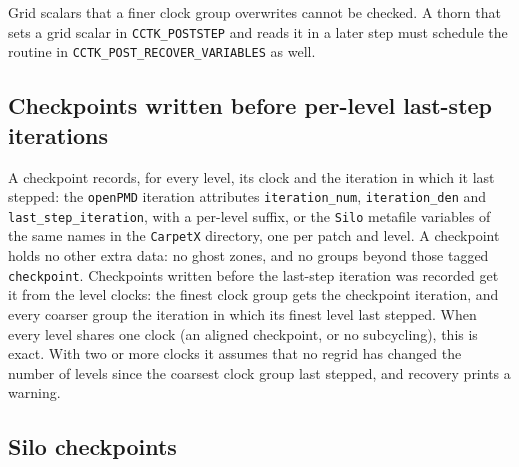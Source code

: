 Grid scalars that a finer clock group overwrites cannot be checked. A thorn that sets a grid scalar in \texttt{CCTK\_POSTSTEP} and reads it in a later step must schedule the routine in \texttt{CCTK\_POST\_RECOVER\_VARIABLES} as well.

\subsection{Checkpoints written before per-level last-step iterations}

A checkpoint records, for every level, its clock and the iteration in which it last stepped: the \texttt{openPMD} iteration attributes \texttt{iteration\_num}, \texttt{iteration\_den} and \texttt{last\_step\_iteration}, with a per-level suffix, or the \texttt{Silo} metafile variables of the same names in the \texttt{CarpetX} directory, one per patch and level. A checkpoint holds no other extra data: no ghost zones, and no groups beyond those tagged \texttt{checkpoint}. Checkpoints written before the last-step iteration was recorded get it from the level clocks: the finest clock group gets the checkpoint iteration, and every coarser group the iteration in which its finest level last stepped. When every level shares one clock (an aligned checkpoint, or no subcycling), this is exact. With two or more clocks it assumes that no regrid has changed the number of levels since the coarsest clock group last stepped, and recovery prints a warning.

\subsection{Silo checkpoints}


